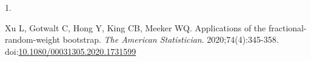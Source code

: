 \documentclass[
  american,
  man, donotrepeattitle,mask,floatsintext]{apa7}
\newlength{\cslhangindent}
\newlength{\csllabelwidth}
\newenvironment{CSLReferences}[2] %
 {\begin{list}{}{%
  \setlength{\itemindent}{0pt}
  \setlength{\leftmargin}{0pt}
  \setlength{\parsep}{0pt}
  \ifodd #1
   \setlength{\leftmargin}{\cslhangindent}
   \setlength{\itemindent}{-1\cslhangindent}
  \fi
  \setlength{\itemsep}{#2\baselineskip}}}
 {\end{list}}
\newcommand{\CSLLeftMargin}[1]{\parbox[t]{\csllabelwidth}{\strut#1\strut}}
\newcommand{\CSLRightInline}[1]{\parbox[t]{\linewidth - \csllabelwidth}{\strut#1\strut}}
\numberwithin{table}{section}
\numberwithin{equation}{section}
\numberwithin{figure}{section}
\begin{document}
\begingroup
\setlength{\parindent}{-0.5in}

\protect{}\label{refs}
\begin{CSLReferences}{0}{1}
\CSLLeftMargin{1. }%
\CSLRightInline{Xu L, Gotwalt C, Hong Y, King CB, Meeker WQ. Applications of the fractional-random-weight bootstrap. \emph{The American Statistician}. 2020;74(4):345-358. doi:\href{https://doi.org/10.1080/00031305.2020.1731599}{10.1080/00031305.2020.1731599}}

\end{CSLReferences}

\endgroup
\end{document}
